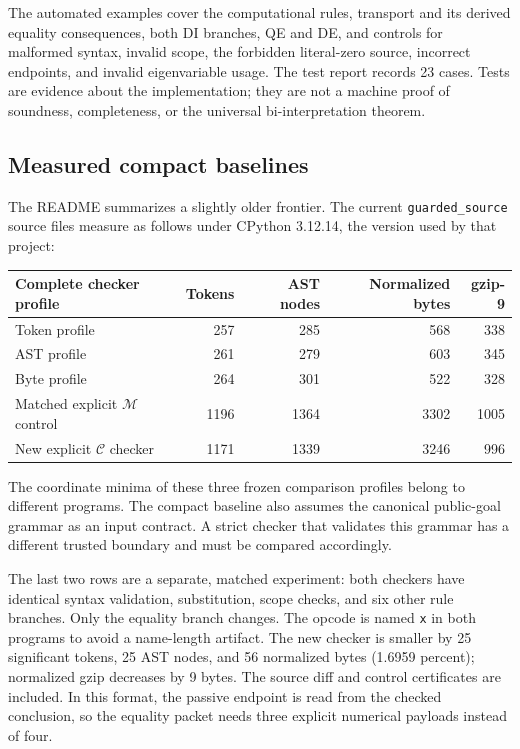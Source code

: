 \documentclass[11pt]{article}
\theoremstyle{definition}\newtheorem{definition}[theorem]{Definition}
\theoremstyle{remark}\newtheorem{remark}[theorem]{Remark}
\newcommand{\C}{\mathcal C}
\newcommand{\M}{\mathcal M}
\newcommand{\NewTokens}{1171}
\newcommand{\NewAST}{1339}
\newcommand{\NewBytes}{3246}
\newcommand{\NewGzip}{996}
\newcommand{\TestCount}{23}
\begin{document}
The automated examples cover the computational rules, transport and its
derived equality consequences, both DI branches, QE and DE, and controls
for malformed syntax, invalid scope, the forbidden literal-zero source,
incorrect endpoints, and invalid eigenvariable usage. The test report
records \TestCount{} cases. Tests are evidence about the implementation;
they are not a machine proof of soundness, completeness, or the universal
bi-interpretation theorem.

\subsection{Measured compact baselines}

The README summarizes a slightly older frontier. The current
\texttt{guarded\_source} source files measure as follows under CPython
3.12.14, the version used by that project\cite{guarded}:
\begin{center}
\begin{tabular}{@{}lrrrr@{}}
\toprule
Complete checker profile & Tokens & AST nodes & Normalized bytes & gzip-9\\
\midrule
Token profile & 257 & 285 & 568 & 338\\
AST profile & 261 & 279 & 603 & 345\\
Byte profile & 264 & 301 & 522 & 328\\
\midrule
Matched explicit $\M$ control & 1196 & 1364 & 3302 & 1005\\
New explicit $\C$ checker & \NewTokens & \NewAST & \NewBytes & \NewGzip\\
\bottomrule
\end{tabular}
\end{center}
The coordinate minima of these three frozen comparison profiles belong
to different programs. The
compact baseline also assumes the canonical public-goal grammar as an
input contract. A strict checker that validates this grammar has a
different trusted boundary and must be compared accordingly.

The last two rows are a separate, matched experiment: both checkers have
identical syntax validation, substitution, scope checks, and six other
rule branches. Only the equality branch changes. The opcode is named
\texttt{x} in both programs to avoid a name-length artifact. The new
checker is smaller by 25 significant tokens, 25 AST nodes, and 56
normalized bytes (1.6959 percent); normalized gzip decreases by 9 bytes.
The source diff and control certificates are included. In this format,
the passive endpoint is read from the checked conclusion, so the equality
packet needs three explicit numerical payloads instead of four.
\end{document}

